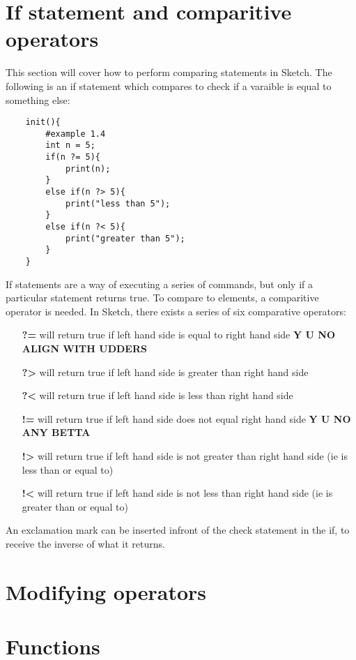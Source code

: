 \documentclass{l3proj}
\begin{document}
\section{If statement and comparitive operators}
\label{comp}
This section will cover how to perform comparing statements in Sketch. The following is an if statement which compares to check if a varaible is equal to something else:
\begin{verbatim}
    init(){
        #example 1.4
        int n = 5;
        if(n ?= 5){
            print(n);
        }
        else if(n ?> 5){
            print("less than 5");
        }
        else if(n ?< 5){
            print("greater than 5");
        }
    }
\end{verbatim}
If statements are a way of executing a series of commands, but only if a particular statement returns true. To compare to elements, a comparitive operator is needed. In Sketch, there exists a series of six comparative operators:
\begin{itemize}
\item[\textbf{?=}] will return true if left hand side is equal to right hand side \textbf{Y U NO ALIGN WITH UDDERS}
\item[\textbf{?\textgreater}] will return true if left hand side is greater than right hand side
\item[\textbf{?\textless}] will return true if left hand side is less than right hand side
\item[\textbf{!=}] will return true if left hand side does not equal right hand side \textbf{Y U NO ANY BETTA}
\item[\textbf{!\textgreater}] will return true if left hand side is not greater than right hand side (ie is less than or equal to)
\item[\textbf{!\textless}] will return true if left hand side is not less than right hand side (ie is greater than or equal to)
\end{itemize}
An exclamation mark can be inserted infront of the check statement in the if, to receive the inverse of what it returns.

\section{Modifying operators}

\section{Functions}
\end{document}
